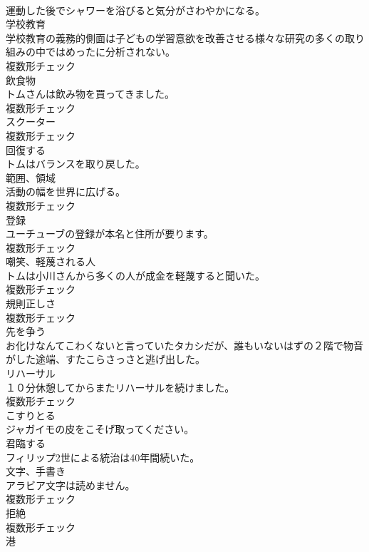 \documentclass[8pt]{extreport}
\begin{document}
\begin{CJK}{UTF8}{min}
\\	運動した後でシャワーを浴びると気分がさわやかになる。	
\\	[名詞]	学校教育	
\\	学校教育の義務的側面は子どもの学習意欲を改善させる様々な研究の多くの取り組みの中ではめったに分析されない。	
\\	複数形チェック
\\	[名詞]	飲食物	
\\	トムさんは飲み物を買ってきました。	
\\	複数形チェック
\\	[名詞]	スクーター	
\\	複数形チェック
\\	[動詞]	回復する	
\\	トムはバランスを取り戻した。	
\\	[名詞]	範囲、領域	
\\	活動の幅を世界に広げる。	
\\	複数形チェック
\\	[名詞]	登録	
\\	ユーチューブの登録が本名と住所が要ります。	
\\	複数形チェック
\\	[名詞]	嘲笑、軽蔑される人	
\\	トムは小川さんから多くの人が成金を軽蔑すると聞いた。	
\\	複数形チェック
\\	[名詞]	規則正しさ	
\\	複数形チェック
\\	[動詞]	先を争う	
\\	お化けなんてこわくないと言っていたタカシだが、誰もいないはずの２階で物音がした途端、すたこらさっさと逃げ出した。	
\\	[名詞]	リハーサル	
\\	１０分休憩してからまたリハーサルを続けました。	
\\	複数形チェック
\\	[動詞]	こすりとる	
\\	ジャガイモの皮をこそげ取ってください。	
\\	[動詞]	君臨する	
\\	フィリップ2世による統治は40年間続いた。	
\\	[名詞]	文字、手書き	
\\	アラビア文字は読めません。	
\\	複数形チェック
\\	[名詞]	拒絶	
\\	複数形チェック
\\	[名詞]	港	

\end{CJK}
\end{document}
